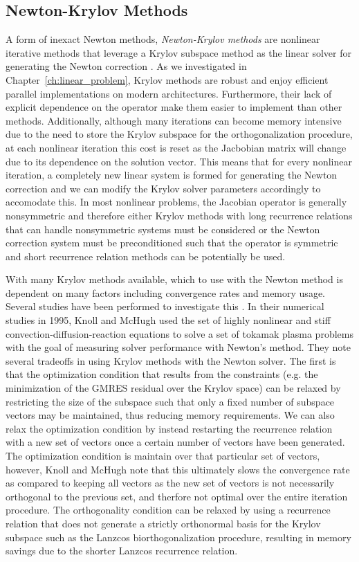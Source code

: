 \subsection{Newton-Krylov Methods}
\label{subsec:newton_krylov_methods}
A form of inexact Newton methods, \textit{Newton-Krylov methods} are
nonlinear iterative methods that leverage a Krylov subspace method as
the linear solver for generating the Newton correction
\citep{kelley_iterative_1995}. As we investigated in
Chapter~\ref{ch:linear_problem}, Krylov methods are robust and enjoy
efficient parallel implementations on modern
architectures. Furthermore, their lack of explicit dependence on the
operator make them easier to implement than other
methods. Additionally, although many iterations can become memory
intensive due to the need to store the Krylov subspace for the
orthogonalization procedure, at each nonlinear iteration this cost is
reset as the Jacbobian matrix will change due to its dependence on the
solution vector. This means that for every nonlinear iteration, a
completely new linear system is formed for generating the Newton
correction and we can modify the Krylov solver parameters accordingly
to accomodate this. In most nonlinear problems, the Jacobian operator
is generally nonsymmetric and therefore either Krylov methods with
long recurrence relations that can handle nonsymmetric systems must be
considered or the Newton correction system must be preconditioned such
that the operator is symmetric and short recurrence relation methods
can be potentially be used.

With many Krylov methods available, which to use with the Newton
method is dependent on many factors including convergence rates and
memory usage. Several studies have been performed to investigate this
\citep{mchugh_inexact_1993,knoll_newton-krylov_1995}. In their
numerical studies in 1995, Knoll and McHugh used the set of highly
nonlinear and stiff convection-diffusion-reaction equations to solve a
set of tokamak plasma problems with the goal of measuring solver
performance with Newton's method. They note several tradeoffs in using
Krylov methods with the Newton solver. The first is that the
optimization condition that results from the constraints (e.g. the
minimization of the GMRES residual over the Krylov space) can be
relaxed by restricting the size of the subspace such that only a fixed
number of subspace vectors may be maintained, thus reducing memory
requirements. We can also relax the optimization condition by instead
restarting the recurrence relation with a new set of vectors once a
certain number of vectors have been generated. The optimization
condition is maintain over that particular set of vectors, however,
Knoll and McHugh note that this ultimately slows the convergence rate
as compared to keeping all vectors as the new set of vectors is not
necessarily orthogonal to the previous set, and therfore not optimal
over the entire iteration procedure. The orthogonality condition can
be relaxed by using a recurrence relation that does not generate a
strictly orthonormal basis for the Krylov subspace such as the Lanzcos
biorthogonalization procedure, resulting in memory savings due to the
shorter Lanzcos recurrence relation.

